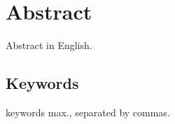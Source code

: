 \chapter*{Abstract}

Abstract in English.


\section*{Keywords}

 keywords max., separated by commas.




